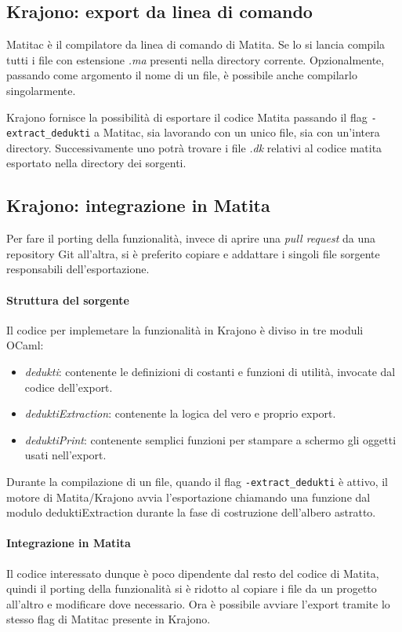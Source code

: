 \documentclass[12pt,a4paper]{report}
\begin{document}
\subsection{Krajono: export da linea di comando}
Matitac è il compilatore da linea di comando di Matita. Se lo si lancia compila
tutti i file con estensione \textit{.ma} presenti nella directory corrente. 
Opzionalmente, passando come argomento il nome di un file, è possibile anche 
compilarlo singolarmente. 

Krajono fornisce la possibilità di esportare il codice Matita passando il flag
\texttt{-extract\_dedukti} a Matitac, sia lavorando con un unico file, sia con
un'intera directory. Successivamente uno potrà trovare i file \textit{.dk} 
relativi al codice matita esportato nella directory dei sorgenti.

\subsection{Krajono: integrazione in Matita}
Per fare il porting della funzionalità, invece di aprire una \textit{pull
request} da una repository Git all'altra, si è preferito copiare e addattare i
singoli file sorgente responsabili dell'esportazione.

\paragraph{Struttura del sorgente}
Il codice per implemetare la funzionalità in Krajono è diviso in tre moduli OCaml:
\begin{itemize}
  \item \textit{dedukti}: contenente le definizioni di costanti e funzioni
    di utilità, invocate dal codice dell'export.
  \item \textit{deduktiExtraction}: contenente la logica del vero e proprio 
    export.
  \item \textit{deduktiPrint}: contenente semplici funzioni per stampare a 
    schermo gli oggetti usati nell'export.
\end{itemize}

Durante la compilazione di un file, quando il flag \texttt{-extract\_dedukti} è
attivo, il motore di Matita/Krajono avvia l'esportazione chiamando una funzione
dal modulo deduktiExtraction durante la fase di costruzione dell'albero astratto.

\paragraph{Integrazione in Matita}
Il codice interessato dunque è poco dipendente dal resto del codice di Matita,
quindi il porting della funzionalità si è ridotto al copiare i file da un progetto
all'altro e modificare dove necessario. Ora è possibile avviare l'export tramite
lo stesso flag di Matitac presente in Krajono.
\end{document}
